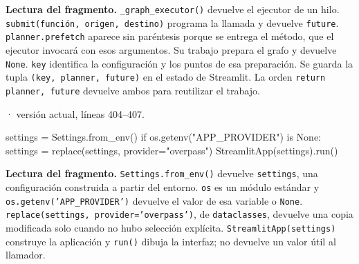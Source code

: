 \documentclass[11pt,a4paper]{article}
\begin{document}
\textbf{Lectura del fragmento.} \texttt{\_graph\_executor()} devuelve el ejecutor de un hilo. \texttt{submit(función, origen, destino)} programa la llamada y devuelve \texttt{future}. \texttt{planner.prefetch} aparece sin paréntesis porque se entrega el método, que el ejecutor invocará con esos argumentos. Su trabajo prepara el grafo y devuelve \texttt{None}. \texttt{key} identifica la configuración y los puntos de esa preparación. Se guarda la tupla \texttt{(key, planner, future)} en el estado de Streamlit. La orden \texttt{return planner, future} devuelve ambos para reutilizar el trabajo.


\smallskip
{\footnotesize\texttt{} · versión actual, líneas 404--407.}\par
\begin{Codigo}[firstnumber=404]
    settings = Settings.from_env()
    if os.getenv("APP_PROVIDER") is None:
        settings = replace(settings, provider="overpass")
    StreamlitApp(settings).run()
\end{Codigo}

\textbf{Lectura del fragmento.} \texttt{Settings.from\_env()} devuelve \texttt{settings}, una configuración construida a partir del entorno. \texttt{os} es un módulo estándar y \texttt{os.getenv('APP\_PROVIDER')} devuelve el valor de esa variable o \texttt{None}. \texttt{replace(settings, provider='overpass')}, de \texttt{dataclasses}, devuelve una copia modificada solo cuando no hubo selección explícita. \texttt{StreamlitApp(settings)} construye la aplicación y \texttt{run()} dibuja la interfaz; no devuelve un valor útil al llamador.
\end{document}
